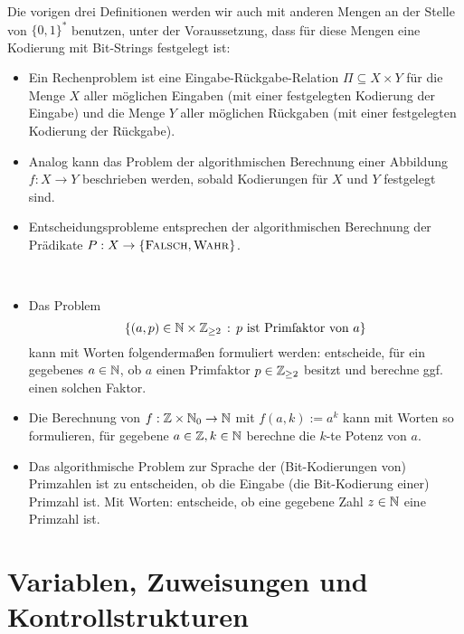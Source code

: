 \begin{bem}
		Die vorigen drei Definitionen werden wir auch mit anderen Mengen an der Stelle von $\{0,1\}^\ast$ benutzen, unter der Voraussetzung, dass für diese Mengen eine Kodierung mit Bit-Strings festgelegt ist:
		\begin{itemize}
				\item Ein Rechenproblem ist eine Eingabe-Rückgabe-Relation $\Pi \subseteq  X \times Y$ für die Menge $X$ aller möglichen Eingaben (mit einer festgelegten Kodierung der Eingabe) und die Menge $Y$ aller möglichen Rückgaben (mit einer festgelegten Kodierung der Rückgabe). 
				\item Analog kann das Problem der algorithmischen Berechnung einer Abbildung $f : X \to Y$ beschrieben werden, sobald Kodierungen für $X$ und $Y$ festgelegt sind. 
				\item Entscheidungsprobleme entsprechen der algorithmischen Berechnung der Prädikate $P : X \to \{\mathop{\text{\textsc{Falsch}}},\mathop{\text{\textsc{Wahr}}}\}$. 
		\end{itemize} 
\end{bem} 

\begin{bsp}\ 
	\begin{itemize} 
		\item Das Problem
		\[
		\left\{  (a,p) \in \mathbb{N} \times \mathbb{Z}_{\ge 2}  \,:\, p \ \text{ist Primfaktor von} \ a \right\}
		\]
		kann mit Worten folgendermaßen formuliert werden: entscheide, für ein gegebenes $a \in \mathbb{N}$, ob $a$ einen Primfaktor $p \in \mathbb{Z}_{\ge 2}$ besitzt und berechne ggf. einen solchen Faktor. 
		\item Die Berechnung von $f : \mathbb{Z} \times \mathbb{N}_0 \to \mathbb{N}$ mit $f(a,k):= a^k$ kann mit Worten so formulieren, für gegebene $a \in \mathbb{Z},k \in \mathbb{N}$ berechne die $k$-te Potenz von $a$. 
		\item Das algorithmische  Problem zur Sprache der (Bit-Kodierungen von) Primzahlen ist zu entscheiden, ob die Eingabe (die Bit-Kodierung einer) Primzahl ist. Mit Worten: entscheide, ob eine gegebene Zahl $z \in \mathbb{N}$ eine Primzahl ist. 
	\end{itemize} 
\end{bsp} 

\section{Variablen, Zuweisungen und Kontrollstrukturen}

